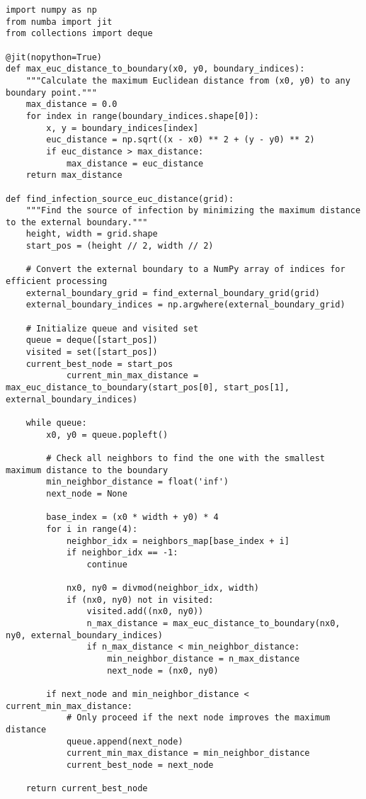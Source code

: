 \begin{lstlisting}[caption=Distance Analysis Algorithm, label=lst:distance-analysis]
import numpy as np
from numba import jit
from collections import deque

@jit(nopython=True)
def max_euc_distance_to_boundary(x0, y0, boundary_indices):
    """Calculate the maximum Euclidean distance from (x0, y0) to any boundary point."""
    max_distance = 0.0
    for index in range(boundary_indices.shape[0]):
        x, y = boundary_indices[index]
        euc_distance = np.sqrt((x - x0) ** 2 + (y - y0) ** 2)
        if euc_distance > max_distance:
            max_distance = euc_distance
    return max_distance

def find_infection_source_euc_distance(grid):
    """Find the source of infection by minimizing the maximum distance to the external boundary."""
    height, width = grid.shape
    start_pos = (height // 2, width // 2)

    # Convert the external boundary to a NumPy array of indices for efficient processing
    external_boundary_grid = find_external_boundary_grid(grid)
    external_boundary_indices = np.argwhere(external_boundary_grid)
    
    # Initialize queue and visited set
    queue = deque([start_pos])
    visited = set([start_pos])
    current_best_node = start_pos
            current_min_max_distance = max_euc_distance_to_boundary(start_pos[0], start_pos[1], external_boundary_indices)

    while queue:
        x0, y0 = queue.popleft()

        # Check all neighbors to find the one with the smallest maximum distance to the boundary
        min_neighbor_distance = float('inf')
        next_node = None

        base_index = (x0 * width + y0) * 4
        for i in range(4):
            neighbor_idx = neighbors_map[base_index + i]
            if neighbor_idx == -1:
                continue

            nx0, ny0 = divmod(neighbor_idx, width)
            if (nx0, ny0) not in visited:
                visited.add((nx0, ny0))
                n_max_distance = max_euc_distance_to_boundary(nx0, ny0, external_boundary_indices)
                if n_max_distance < min_neighbor_distance:
                    min_neighbor_distance = n_max_distance
                    next_node = (nx0, ny0)
                    
        if next_node and min_neighbor_distance < current_min_max_distance:
            # Only proceed if the next node improves the maximum distance
            queue.append(next_node)
            current_min_max_distance = min_neighbor_distance
            current_best_node = next_node

    return current_best_node
\end{lstlisting}

